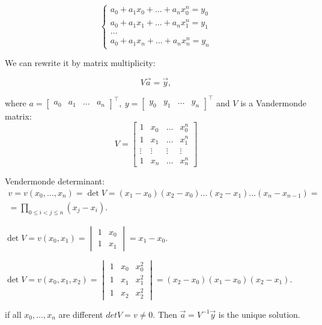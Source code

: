 \[
    \left\{
        \begin{array}{c}
            a_0 + a_1 x_0 + \ldots + a_n x_0^n = y_0 \\
            a_0 + a_1 x_1 + \ldots + a_n x_1^n = y_1 \\
            \ldots \\
            a_0 + a_1 x_n + \ldots + a_n x_n^n = y_n
        \end{array}
    \right.  
\]
\vspace*{0.5cm}

We can rewrite it by matrix multiplicity:

\[
    V\vec{a} = \vec{y},
\]

where $a = \begin{bmatrix}
    a_0 & a_1 & \ldots & a_n
\end{bmatrix}^\intercal, \ y = \begin{bmatrix}
    y_0 & y_1 & \ldots & y_n
\end{bmatrix}^\intercal$ and $V$ is a Vandermonde matrix:
\[
    V = \begin{bmatrix}
        1 & x_0 & \ldots & x_0^n \\
        1 & x_1 & \ldots & x_1^n \\
        \vdots & \vdots & \vdots & \vdots\\
        1 & x_n & \ldots & x_n^n
    \end{bmatrix}  
\]
\begin{note}{}{}
    Vendermonde determinant:
    \begin{gather*}
        v = v(x_0, \ldots, x_n) = \det V = (x_1 - x_0)(x_2-x_0)\ldots(x_2-x_1)\ldots (x_n - x_{n-1}) =   \\
        = \prod\limits_{0 \leq i < j \leq n} (x_j - x_i).
    \end{gather*}
\end{note}
\Ex $\det V = v(x_0, x_1) = \begin{vmatrix}
    1 & x_0\\
    1 & x_1
\end{vmatrix} = x_1 - x_0$.

\Ex $\det V = v(x_0, x_1, x_2) = \begin{vmatrix}
    1 & x_0 & x_0^2\\
    1 & x_1 & x_1^2\\
    1 & x_2 & x_2^2
\end{vmatrix} = (x_2 - x_0)(x_1 - x_0)(x_2 - x_1)$.

\cons if all $x_0, \ldots, x_n$ are different $det V = v \neq 0$. Then $\vec{a} = V^{-1}\vec{y}$ is the unique solution.

